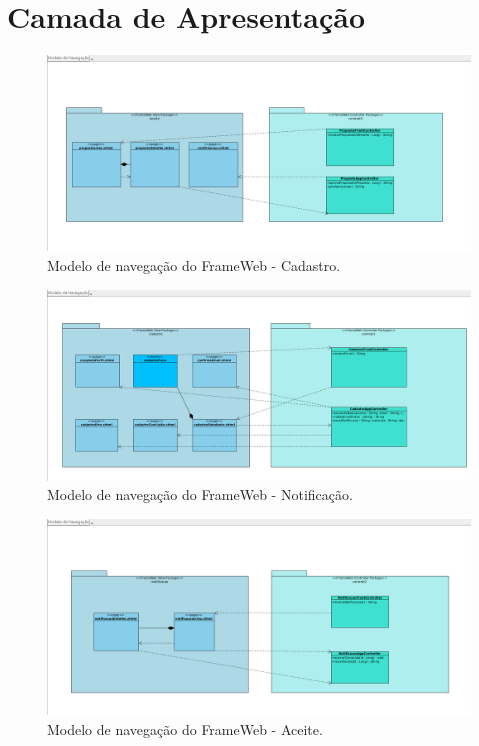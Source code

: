 \section{Camada de Apresentação}
\label{sec-frameweb-apresentacao}

\begin{figure}[H]
	\centering
	\includegraphics[width=1.0\textwidth]{figuras/figura_modelo_navegacao_cadastro.png}
	\caption{Modelo de navegação do FrameWeb - Cadastro.}
	\label{figura-cadastro}
\end{figure}

\begin{figure}[H]
	\centering
	\includegraphics[width=1.0\textwidth]{figuras/figura_modelo_navegacao_notificacao.png}
	\caption{Modelo de navegação do FrameWeb - Notificação.}
	\label{figura-notificacao}
\end{figure}

\begin{figure}[H]
	\centering
	\includegraphics[width=1.0\textwidth]{figuras/figura_modelo_navegacao_aceite.png}
	\caption{Modelo de navegação do FrameWeb - Aceite.}
	\label{figura-aceite}
\end{figure}



